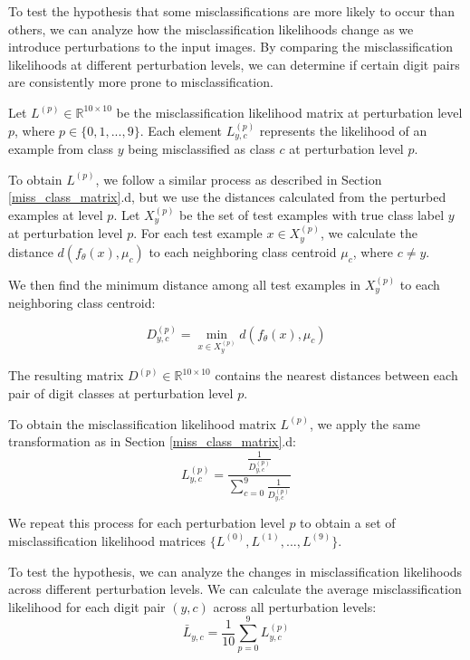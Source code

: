 To test the hypothesis that some misclassifications are more likely to occur than others, we can analyze how the misclassification likelihoods change as we introduce perturbations to the input images. By comparing the misclassification likelihoods at different perturbation levels, we can determine if certain digit pairs are consistently more prone to misclassification.

Let $L^{(p)} \in \mathbb{R}^{10 \times 10}$ be the misclassification likelihood matrix at perturbation level $p$, where $p \in \{0, 1, ..., 9\}$. Each element $L^{(p)}_{y,c}$ represents the likelihood of an example from class $y$ being misclassified as class $c$ at perturbation level $p$.

To obtain $L^{(p)}$, we follow a similar process as described in Section \ref{miss_class_matrix}.d, but we use the distances calculated from the perturbed examples at level $p$. Let $X^{(p)}_y$ be the set of test examples with true class label $y$ at perturbation level $p$. For each test example $x \in X^{(p)}_y$, we calculate the distance $d(f_\theta(x), \mu_c)$ to each neighboring class centroid $\mu_c$, where $c \neq y$.

We then find the minimum distance among all test examples in $X^{(p)}_y$ to each neighboring class centroid:

\begin{equation}
D^{(p)}_{y,c} = \min_{x \in X^{(p)}_y} d(f_\theta(x), \mu_c)    
\end{equation}

The resulting matrix $D^{(p)} \in \mathbb{R}^{10 \times 10}$ contains the nearest distances between each pair of digit classes at perturbation level $p$.

To obtain the misclassification likelihood matrix $L^{(p)}$, we apply the same transformation as in Section \ref{miss_class_matrix}.d:
\begin{equation}
L^{(p)}_{y,c} = \frac{\frac{1}{D^{(p)}_{y,c}}}{\sum\limits_{c=0}^9 \frac{1}{D^{(p)}_{y,c}}}    
\end{equation}

We repeat this process for each perturbation level $p$ to obtain a set of misclassification likelihood matrices $\{L^{(0)}, L^{(1)}, ..., L^{(9)}\}$.

To test the hypothesis, we can analyze the changes in misclassification likelihoods across different perturbation levels. We can calculate the average misclassification likelihood for each digit pair $(y, c)$ across all perturbation levels:
\begin{equation}
\bar{L}_{y,c} = \frac{1}{10} \sum_{p=0}^9 L^{(p)}_{y,c}    
\end{equation}

